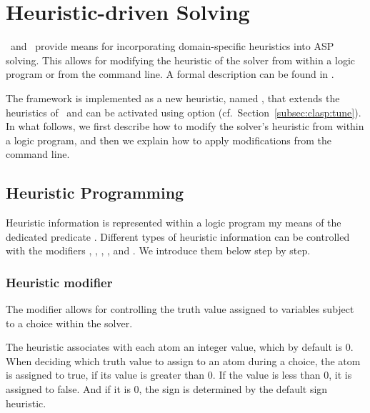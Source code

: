 
\section{Heuristic-driven Solving}
\label{sec:heuristic}
\clasp\ and \clingo\ provide means for incorporating domain-specific heuristics into ASP solving.
This allows for modifying the heuristic of the solver from within a logic program or from the command line.
A formal description can be found in \cite{gekaotroscwa13a}.

The framework is implemented as a new heuristic, named ,
that extends the  heuristics of \clasp\ 
and can be activated using option 
(cf.\ Section~\ref{subsec:clasp:tune}).
In what follows,
we first describe how to modify the solver's heuristic from within a logic program, 
and then we explain how to apply modifications from the command line.

\subsection{Heuristic Programming}

Heuristic information is represented within a logic program my means of the dedicated predicate .
Different types of heuristic information can be controlled with the modifiers 
\code{sign}, \code{level}, \code{true}, \code{false}, \code{init} and .
We introduce them below step by step.

\subsubsection{Heuristic modifier }
The modifier \code{sign} allows for controlling the truth value assigned to variables subject to a choice within the solver.

The  heuristic associates with each atom an integer  value, which by default is $0$.
When deciding which truth value to assign to an atom during a choice, the atom is assigned to true, if its  value is greater than $0$. 
If the \code{sign} value is less than 0, it is assigned to false.
And if it is $0$, the sign is determined by the default sign heuristic.

